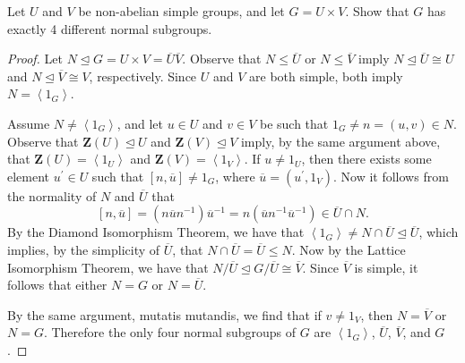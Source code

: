 \documentclass[10pt]{amsart}
\newcommand{\cntr}[1]{\mathbf{Z}\left(#1\right)}
\begin{document}
\begin{thm}
  Let $U$ and $V$ be non-abelian simple groups, and let $G = U \times V$.
  Show that $G$ has exactly 4 different normal subgroups.
  \begin{proof}
    Let $N \unlhd G = U \times V = \overline{U}\overline{V}$.
    Observe that $N \leq \overline{U}$ or $N \leq \overline{V}$ imply $N \unlhd \overline{U} \cong U$ and $N \unlhd \overline{V} \cong V$, respectively.
    Since $U$ and $V$ are both simple, both imply $N = \left< 1_G \right>$.

    Assume $N \not = \left< 1_G \right>$, and let $u \in U$ and $v \in V$ be such that $1_G \not = n = (u,v) \in N$.
    Observe that $\cntr{U} \unlhd U$ and $\cntr{V} \unlhd V$ imply, by the same argument above, that $\cntr{U} = \left< 1_U \right>$ and $\cntr{V} = \left< 1_V \right>$.
    If $u \not = 1_U$, then there exists some element $u^\prime \in U$ such that $[n,\overline{u}] \not = 1_G$, where $\overline{u} = (u^\prime, 1_V)$.
    Now it follows from the normality of $N$ and $\overline{U}$ that $$[n,\overline{u}] = (n\overline{u}n^{-1})\overline{u}^{-1} = n(\overline{u}n^{-1}\overline{u}^{-1}) \in \overline{U} \cap N.$$
    By the Diamond Isomorphism Theorem, we have that $\left<1_G\right> \not = N \cap \overline{U} \unlhd \overline{U}$, which implies, by the simplicity of $\overline{U}$, that $N \cap \overline{U} = \overline{U} \leq N$.
    Now by the Lattice Isomorphism Theorem, we have that $N/\overline{U} \unlhd G/\overline{U} \cong \overline{V}$.
    Since $\overline V$ is simple, it follows that either $N = G$ or $N = \overline{U}$.
    
    By the same argument, mutatis mutandis, we find that if $v \not = 1_V$, then $N = \overline{V}$ or $N = G$.
    Therefore the only four normal subgroups of $G$ are $\left<1_G\right>$, $\overline{U}$, $\overline{V}$, and $G$.
  \end{proof}
\end{thm}
\end{document}

